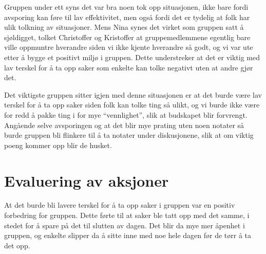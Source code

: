 Gruppen under ett syns det var bra noen tok opp situasjonen, ikke bare fordi avsporing kan føre til lav effektivitet, men også fordi det er tydelig at folk har ulik tolkning av situasjoner. Mens Nina synes det virket som gruppen satt å sjøldigget, tolket Christoffer og Kristoffer at gruppemedlemmene egentlig bare ville oppmuntre hverandre siden vi ikke kjente hverandre så godt, og vi var ute etter å bygge et positivt miljø i gruppen. Dette understreker at det er viktig med lav terskel for å ta opp saker som enkelte kan tolke negativt uten at andre gjør det.

Det viktigste gruppen sitter igjen med denne situasjonen er at det burde være lav terskel for å ta opp saker siden folk kan tolke ting så ulikt, og vi burde ikke være for redd å pakke ting i for mye “vennlighet”, slik at budskapet blir forvrengt. Angående selve avsporingen og at det blir mye prating uten noen notater så burde gruppen bli flinkere til å ta notater under diskusjonene, slik at om viktig poeng kommer opp blir de husket.
\section{Evaluering av aksjoner}
At det burde bli lavere terskel for å ta opp saker i gruppen var en positiv forbedring for gruppen. Dette førte til at saker ble tatt opp med det samme, i stedet for å spare på det til slutten av dagen. Det blir da mye mer åpenhet i gruppen, og enkelte slipper da å sitte inne med noe hele dagen før de tørr å ta det opp.
